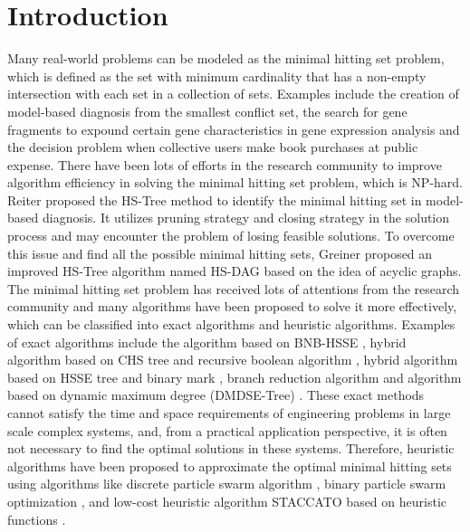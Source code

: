 \section{Introduction}
Many real-world problems can be modeled as the minimal hitting set problem, which is defined as the set with minimum cardinality that has a non-empty intersection with each set in a collection of sets.  
Examples include the creation of model-based diagnosis from the smallest conflict set, the search for gene fragments to expound certain gene characteristics in gene expression analysis and the decision problem when collective users make book purchases at public expense.
There have been lots of efforts in the research community to improve algorithm efficiency in solving the minimal hitting set problem, which is NP-hard.
Reiter \citep{c1reiter1987theory} proposed the HS-Tree method to identify the minimal hitting set in model-based diagnosis.
It utilizes pruning strategy and closing strategy in the solution process and may encounter the problem of losing feasible solutions.
To overcome this issue and find all the possible minimal hitting sets, Greiner \citep{c2greiner1989correction} proposed an improved HS-Tree algorithm named HS-DAG based on the idea of acyclic graphs.
The minimal hitting set problem has received lots of attentions from the research community and many algorithms have been proposed to solve it more effectively, which can be classified into exact algorithms and heuristic algorithms.
Examples of exact algorithms include the algorithm based on BNB-HSSE \citep{c3xiaomei}, hybrid algorithm based on CHS tree and recursive boolean algorithm \citep{c4wang2010research}, hybrid algorithm based on HSSE tree and binary mark \citep{c5feng2011method}, branch reduction algorithm \citep{c6shi2010exact} and algorithm based on dynamic maximum degree (DMDSE-Tree) \citep{c7zhang}.
These exact methods cannot satisfy the time and space requirements of engineering problems in large scale complex systems, and, from a practical application perspective, it is often not necessary to find the optimal solutions in these systems.
Therefore, heuristic algorithms have been proposed to approximate the optimal minimal hitting sets using algorithms like discrete particle swarm algorithm \citep{c8}, binary particle swarm optimization \citep{c9}, and low-cost heuristic algorithm STACCATO based on heuristic functions \citep{c10}.



